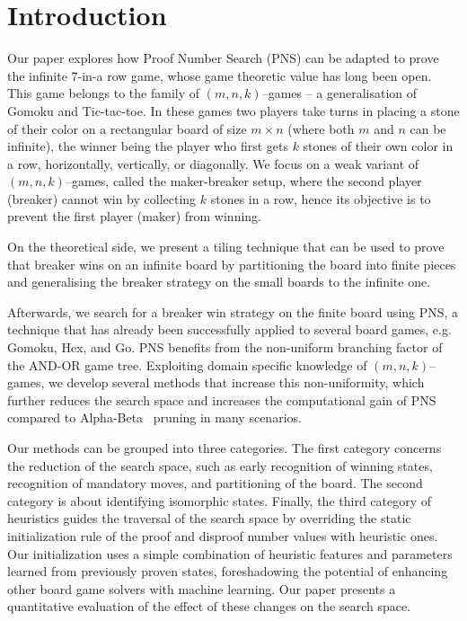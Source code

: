 \documentclass[conference]{IEEEtran}
\theoremstyle{definition}
\begin{document}
\section{Introduction}
\label{sec:introduction}

Our paper explores how Proof Number Search (PNS) can be adapted to prove the infinite 7-in-a row game, whose game theoretic value has long been open. This game belongs to the family of $(m,n,k)$--games -- a generalisation of Gomoku and Tic-tac-toe. In these games two players take turns in placing a stone of their color on a rectangular board of size $m \times n$ (where both $m$ and $n$ can be
infinite), the winner being the player who first gets $k$ stones of
their own color in a row, horizontally, vertically, or
diagonally. We focus on a weak variant of $(m,n,k)$--games, called the maker-breaker setup, where the second player (breaker) cannot win by collecting $k$ stones in a row, hence its objective is to prevent the first player (maker) from winning.

On the theoretical side, we present a tiling technique that can be used to prove that breaker wins on an infinite board by partitioning the board into finite pieces and generalising the breaker strategy on the small boards to the infinite one.

Afterwards, we search for a breaker win strategy on the finite board using PNS, a technique that has already been successfully applied to several board games, e.g. Gomoku, Hex, and Go. PNS benefits from the non-uniform branching factor of the AND-OR game tree. Exploiting domain specific knowledge of $(m,n,k)$--games, we develop several methods that increase this non-uniformity, which further reduces the search space and increases the computational gain of PNS compared to Alpha-Beta~\cite{Bundy1984} pruning in many scenarios. 

Our methods can be grouped into three categories. The first category concerns the reduction of the search space, such as early recognition of winning states, recognition of mandatory moves,  and partitioning of the board. The second category is about identifying isomorphic states. Finally, the third category of heuristics guides the traversal of the search space by overriding the static initialization rule of the proof and disproof number values with heuristic ones. Our initialization uses a simple combination of heuristic features and parameters learned from previously proven states, foreshadowing the potential of enhancing other board game solvers with machine learning. Our paper presents a quantitative evaluation of the effect of these changes on the search space.
\end{document}
